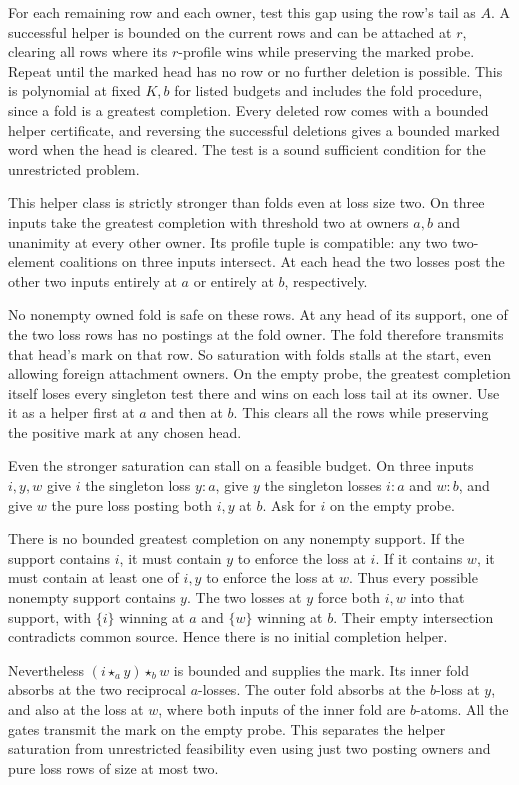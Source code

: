For each remaining row and each owner, test this
gap using the row's tail as $A$. A successful
helper is bounded on the current rows and can
be attached at $r$, clearing all rows where its
$r$-profile wins while preserving the marked
probe. Repeat until the marked head has no row
or no further deletion is possible. This is
polynomial at fixed $K,b$ for listed budgets
and includes the fold procedure, since a fold
is a greatest completion. Every deleted row
comes with a bounded helper certificate, and
reversing the successful deletions gives a
bounded marked word when the head is cleared.
The test is a sound sufficient condition for
the unrestricted problem.

This helper class is strictly stronger than folds
even at loss size two. On three inputs take the
greatest completion with threshold two at owners
$a,b$ and unanimity at every other owner. Its
profile tuple is compatible: any two two-element
coalitions on three inputs intersect. At each
head the two losses post the other two inputs
entirely at $a$ or entirely at $b$, respectively.

No nonempty owned fold is safe on these rows.
At any head of its support, one of the two loss
rows has no postings at the fold owner. The
fold therefore transmits that head's mark on
that row. So saturation with folds stalls at
the start, even allowing foreign attachment
owners. On the empty probe, the greatest
completion itself loses every singleton test
there and wins on each loss tail at its owner.
Use it as a helper first at $a$ and then at
$b$. This clears all the rows while preserving
the positive mark at any chosen head.

Even the stronger saturation can stall on a feasible
budget. On three inputs $i,y,w$ give $i$ the singleton
loss $y:a$, give $y$ the singleton losses $i:a$ and
$w:b$, and give $w$ the pure loss posting both $i,y$
at $b$. Ask for $i$ on the empty probe.

There is no bounded greatest completion on any
nonempty support. If the support contains $i$,
it must contain $y$ to enforce the loss at $i$.
If it contains $w$, it must contain at least
one of $i,y$ to enforce the loss at $w$.
Thus every possible nonempty support contains
$y$. The two losses at $y$ force both $i,w$
into that support, with $\{i\}$ winning at $a$
and $\{w\}$ winning at $b$. Their empty
intersection contradicts common source.
Hence there is no initial completion helper.

Nevertheless $(i\star_a y)\star_b w$ is
bounded and supplies the mark. Its inner
fold absorbs at the two reciprocal $a$-losses.
The outer fold absorbs at the $b$-loss at $y$,
and also at the loss at $w$, where both inputs
of the inner fold are $b$-atoms. All the gates
transmit the mark on the empty probe. This
separates the helper saturation from unrestricted
feasibility even using just two posting owners
and pure loss rows of size at most two.


